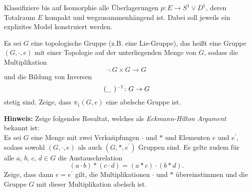 %	
%	
%		

\begin{aufgabe}
	Klassifiziere bis auf Isomorphie alle Überlagerungen $p\colon E\to S^1\vee D^1$, deren Totalraum $E$ kompakt und wegzusammenhängend ist. Dabei soll jeweils ein	explizites Model konstruiert werden.
\end{aufgabe}

\begin{aufgabe}
	Es sei $G$ eine topologische Gruppe (z.B. eine Lie-Gruppe), das heißt eine Gruppe $(G, \cdot, e)$ mit einer Topologie auf der unterliegenden Menge von $G$, sodass die Multiplikation 
	\[ \cdot\colon G\times G\to G \]
	und die Bildung von Inversen \[ ( \_\ )\inverse\colon G\to G\]
	stetig sind. Zeige, dass $\pi_1(G,e)$ eine abelsche Gruppe ist.
	
	\textbf{Hinweis:} Zeige folgendes Resultat, welches als {\itshape Eckmann-Hilton Argument} bekannt ist:\\
	Es sei $G$ eine Menge mit zwei Verknüpfungen $\cdot$ und $\ast$ und Elementen $e$ und $e^\prime$, sodass sowohl $(G,\cdot, e)$ als auch $(G, \ast, e^\prime)$ Gruppen sind. Es gelte zudem für alle $a,\, b,\, c,\, d\in G$ die Austauschrelation
	\[ (a\cdot b)\ast (c\cdot d)= (a\ast c)\cdot (b\ast d).\]
	Zeige, dass dann $e=e^\prime$ gilt, die Multiplikationen $\cdot$ und $\ast$ übereinstimmen und die Gruppe $G$ mit dieser Multiplikation abelsch ist.
\end{aufgabe}

